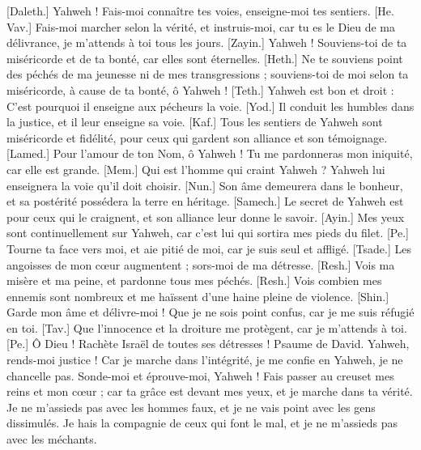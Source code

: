 \begin{multicols}{2}
[Daleth.] Yahweh ! Fais-moi connaître tes voies, enseigne-moi tes sentiers.
[He. Vav.] Fais-moi marcher selon la vérité, et instruis-moi, car tu es le Dieu de ma délivrance, je m'attends à toi tous les jours.
[Zayin.] Yahweh ! Souviens-toi de ta miséricorde et de ta bonté, car elles sont éternelles.
[Heth.] Ne te souviens point des péchés de ma jeunesse ni de mes transgressions ; souviens-toi de moi selon ta miséricorde, à cause de ta bonté, ô Yahweh !
[Teth.] Yahweh est bon et droit : C'est pourquoi il enseigne aux pécheurs la voie.
[Yod.] Il conduit les humbles dans la justice, et il leur enseigne sa voie.
[Kaf.] Tous les sentiers de Yahweh sont miséricorde et fidélité, pour ceux qui gardent son alliance et son témoignage.
[Lamed.] Pour l'amour de ton Nom, ô Yahweh ! Tu me pardonneras mon iniquité, car elle est grande.
[Mem.] Qui est l'homme qui craint Yahweh ? Yahweh lui enseignera la voie qu'il doit choisir.
[Nun.] Son âme demeurera dans le bonheur, et sa postérité possédera la terre en héritage.
[Samech.] Le secret de Yahweh est pour ceux qui le craignent, et son alliance leur donne le savoir.
[Ayin.] Mes yeux sont continuellement sur Yahweh, car c'est lui qui sortira mes pieds du filet.
[Pe.] Tourne ta face vers moi, et aie pitié de moi, car je suis seul et affligé.
[Tsade.] Les angoisses de mon cœur augmentent ; sors-moi de ma détresse.
[Resh.] Vois ma misère et ma peine, et pardonne tous mes péchés.
[Resh.] Vois combien mes ennemis sont nombreux et me haïssent d'une haine pleine de violence.
[Shin.] Garde mon âme et délivre-moi ! Que je ne sois point confus, car je me suis réfugié en toi.
[Tav.] Que l'innocence et la droiture me protègent, car je m'attends à toi.
[Pe.] Ô Dieu ! Rachète Israël de toutes ses détresses !
\VerseOne{}Psaume de David. Yahweh, rends-moi justice ! Car je marche dans l'intégrité, je me confie en Yahweh, je ne chancelle pas.
Sonde-moi et éprouve-moi, Yahweh ! Fais passer au creuset mes reins et mon cœur ;
car ta grâce est devant mes yeux, et je marche dans ta vérité.
Je ne m'assieds pas avec les hommes faux, et je ne vais point avec les gens dissimulés.
Je hais la compagnie de ceux qui font le mal, et je ne m'assieds pas avec les méchants.

\end{multicols}
